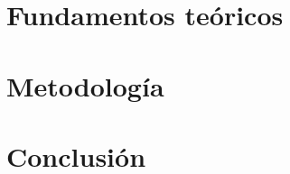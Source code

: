 \documentclass[a4paper,11pt,oneside]{book}
\begin{document}
    
    
    \newpage
    
    

     
    
    
   
       
    
    
    \tableofcontents
    
    \mainmatter
    
    
    
    \part{Fundamentos teóricos}
    
    
    
    \part{Metodología}
    
    

    \part{Conclusión}
    

    
    
    
    
    
\end{document}
